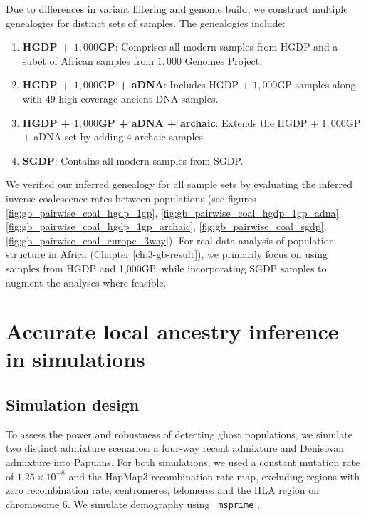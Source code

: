 Due to differences in variant filtering and genome build, we construct multiple genealogies for distinct sets of samples. The genealogies include:  
\begin{enumerate}
    \item \textbf{HGDP + $1{,}000$GP}: Comprises all modern samples from HGDP and a subet of African samples from $1{,}000$ Genomes Project.  
    \item \textbf{HGDP + $1{,}000$GP + aDNA}: Includes HGDP + $1{,}000$GP samples along with 49 high-coverage ancient DNA samples.  
    \item \textbf{HGDP + $1{,}000$GP + aDNA + archaic}: Extends the HGDP + $1{,}000$GP + aDNA set by adding 4 archaic samples.  
    \item \textbf{SGDP}: Contains all modern samples from SGDP.  
\end{enumerate}  
We verified our inferred genealogy for all sample sets by evaluating the inferred inverse coalescence rates between populations (see figures \ref{fig:gb_pairwise_coal_hgdp_1gp}, \ref{fig:gb_pairwise_coal_hgdp_1gp_adna}, \ref{fig:gb_pairwise_coal_hgdp_1gp_archaic}, \ref{fig:gb_pairwise_coal_sgdp}, \ref{fig:gb_pairwise_coal_europe_3way}). For real data analysis of population structure in Africa (Chapter \ref{ch:3-gb-result}), we primarily focus on using samples from HGDP and 1,000GP, while incorporating SGDP samples to augment the analyses where feasible.

\section{Accurate local ancestry inference in simulations}
\label{sec:ch2-gb-sim}
\subsection{Simulation design}
\label{sec:ch2-gb-sim-design}

To assess the power and robustness of detecting ghost populations, we simulate two distinct admixture scenarios: a four-way recent admixture and Denisovan admixture into Papuans. For both simulations, we used a constant mutation rate of $1.25 \times 10^{-8}$ and the HapMap3 recombination rate map, excluding regions with zero recombination rate, centromeres, telomeres and the HLA region on chromosome 6. We simulate demography using \texttt{ msprime} \cite{kelleher2016efficient}.

